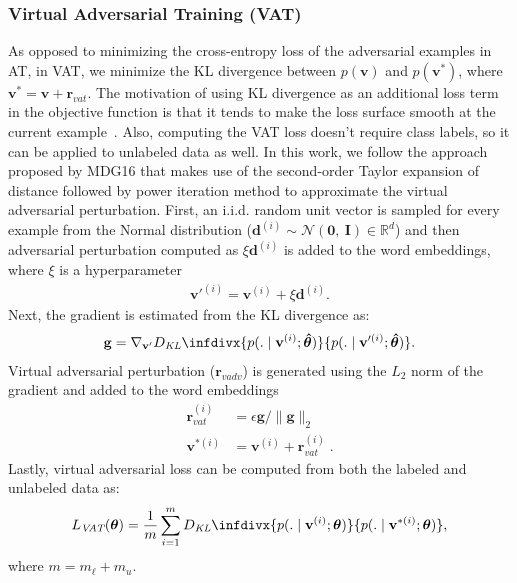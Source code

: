 \documentclass[letterpaper]{article}
\newcommand{\citep}{\cite}
\newcommand{\infdiv}{D_{\textit{KL}}\infdivx}
\begin{document}
\subsubsection{\textbf{Virtual Adversarial Training (VAT)}}
As opposed to minimizing the cross-entropy loss of the adversarial examples in AT, in VAT, we minimize the KL divergence between $p(\mathbf{v})$ and $p(\mathbf{v}^*)$, where $\mathbf{v}^* = \mathbf{v} + \mathbf{r}_{\textit{vat}}$. The motivation of using KL divergence as an additional loss term in the objective function is that it tends to make the loss surface smooth at the current example~\citep{miyato2017virtual}. Also, computing the VAT loss doesn't require class labels, so it can be applied to unlabeled data as well. In this work, we follow the approach proposed by MDG16 that makes use of the second-order Taylor expansion of distance followed by power iteration method to approximate the virtual adversarial perturbation. First, an i.i.d. random unit vector is sampled for every example from the Normal distribution ($\mathbf{d}^{(i)}\sim\mathcal{N}(\mathbf{0},\:\mathbf{I})\in\mathbb{R}^d$) and then adversarial perturbation computed as $\xi \mathbf{d}^{(i)}$ is added to the word embeddings, where $\xi$ is a hyperparameter
\begin{align*}
\mathbf{v}'^{(i)} = \mathbf{v}^{(i)} + \xi\mathbf{d}^{(i)}.
\end{align*}
Next, the gradient is estimated from the KL divergence as:
\begin{align*}
\mathbf{g} = \nabla_{\mathbf{v'}}\infdiv
{p(. \mid \mathbf{v}^{(i)}; \boldsymbol{\hat{\theta}})}
{p(. \mid \mathbf{v}'^{(i)}; \boldsymbol{\hat{\theta}})}.
\end{align*}
Virtual adversarial perturbation ($\mathbf{r}_{\textit{vadv}}$) is generated using the $L_2$ norm of the gradient and added to the word embeddings
\begin{align*}
\mathbf{r}^{(i)}_{ \textit{vat} } &= \epsilon \mathbf{g}/\|\mathbf{g}\|_2\\
\mathbf{v}^{*(i)} &= \mathbf{v}^{(i)} + \mathbf{r}^{(i)}_{\textit{vat}}\;.
\end{align*}
Lastly, virtual adversarial loss can be computed from both the labeled and unlabeled data as:
\begin{align*}
L_{\textit{VAT}}(\boldsymbol{\theta}) = \frac{1}{m} \sum_{i=1}^{m} \infdiv{p(. \mid \mathbf{v}^{(i)};\boldsymbol{\theta})}{p(. \mid \mathbf{v}^{*(i)};\boldsymbol{\theta})},
\end{align*}
where $m = m_{\ell} + m_\textit{u}$.
\end{document}
